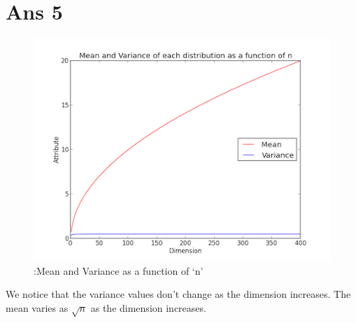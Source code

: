 \documentclass[10pt]{article}
\begin{document}
\begin{flushleft}
\begin{figure}[!htb]
\begin{floatrow}
    \end{floatrow}
\end{figure}
\end{flushleft}
\vspace{20em}
\section*{Ans 5}
\begin{flushleft}
\begin{figure}[!htb]
\includegraphics[scale = 0.8]{6.png}
\caption{:Mean and Variance as a function of `n'}
\end{figure}
We notice that the variance values don't change as the dimension increases. The mean varies as $\sqrt{n}$ as the dimension increases.
\end{flushleft}
\end{document}
